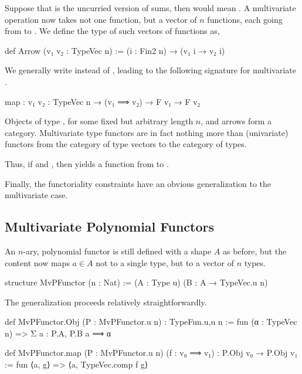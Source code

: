 Suppose that  is the uncurried version of sums, then  would mean .
A multivariate  operation now takes not one function, but a vector of $n$ functions, each going from  to . We define the type of such vectors of functions as,
\begin{leancode}    
    def Arrow (v₁ v₂ : TypeVec n) := (i : Fin2 n) → (v₁ i → v₂ i)
\end{leancode}  
We generally write  instead of , leading to the following signature
for multivariate .

\begin{leancode}
    map : {v₁ v₂ : TypeVec n} → (v₁ ⟹ v₂) → F v₁ → F v₂
\end{leancode}
\begin{remark}
    Objects of type , for some fixed but arbitrary length $n$, and arrows  form a category. 
    Multivariate type functors are in fact nothing more than (univariate) functors from the category of type vectors to the category of types.
\end{remark}

Thus, if  and , then  yields a function from  to .

Finally, the functoriality constraints have an obvious generalization to the multivariate case.

\subsection*{Multivariate Polynomial Functors}
An $n$-ary, polynomial functor is still defined with a shape $A$ as before, but the content now maps $a ∈ A$ not to a single type, but to a vector of $n$ types.

\begin{leancode}
    structure MvPFunctor (n : Nat) := (A : Type u) (B : A → TypeVec.{u} n)
\end{leancode}

The generalization proceeds relatively straightforwardly.
\begin{leancode}
    def MvPFunctor.Obj (P : MvPFunctor.{u} n) : TypeFun.{u,u} n
        := fun (α : TypeVec n) => Σ a : P.A, P.B a ⟹ α

    def MvPFunctor.map  (P : MvPFunctor.{u} n) 
                        (f : v₀ ⟹ v₁) 
                            : P.Obj v₀ → P.Obj v₁ 
        := fun ⟨a, g⟩ => ⟨a, TypeVec.comp f g⟩
\end{leancode}

